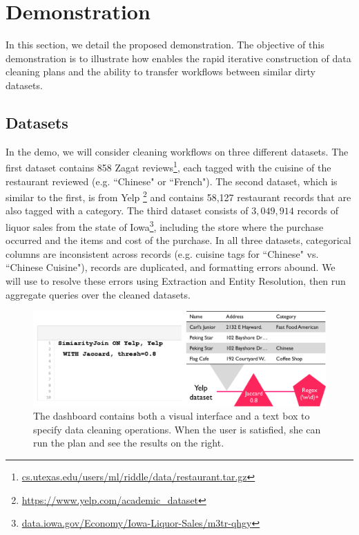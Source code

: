 \section{Demonstration}
In this section, we detail the proposed demonstration.
The objective of this demonstration is to illustrate 
how \sys enables the rapid iterative construction of data cleaning plans
and the ability to transfer workflows between similar dirty datasets.

\subsection{Datasets}
In the demo, we will consider cleaning workflows on three different datasets.
The first dataset contains 858 Zagat reviews\footnote{\scriptsize{ \url{cs.utexas.edu/users/ml/riddle/data/restaurant.tar.gz}}},
each tagged with the cuisine of the restaurant reviewed (e.g. ``Chinese" or ``French").
The second dataset, which is similar to the first, is from Yelp \footnote{\scriptsize{\url{https://www.yelp.com/academic_dataset}}} and contains 58,127 restaurant records that are also tagged with a category.
The third dataset consists of $3,049,914$ records of liquor sales from the state of Iowa\footnote{\scriptsize{\url{data.iowa.gov/Economy/Iowa-Liquor-Sales/m3tr-qhgy}}}, including the store where the purchase occurred and the items and cost of the purchase.
In all three datasets, categorical columns are inconsistent across records (e.g. cuisine tags for ``Chinese" vs. ``Chinese Cuisine"), records are duplicated, and formatting errors abound. 
We will use \sys to resolve these errors using Extraction and Entity Resolution, then run aggregate queries over the cleaned datasets.

\begin{figure}[t]
\centering
 \includegraphics[width=\columnwidth]{figs/dashboard_screenshot.png}
 \caption{The dashboard contains both a visual interface and a text box to specify data cleaning operations. When the user is satisfied, she can run the plan and see the results on the right. \label{screenshot}}
\end{figure}


